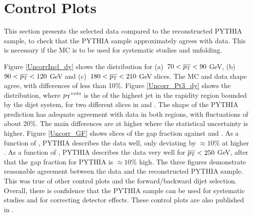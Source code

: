 \section{Control Plots}
\label{sec:GBJ1:Uncorr}
This section presents the selected data compared to the reconstructed PYTHIA sample, to check that the PYTHIA sample approximately agrees with data.
This is necessary if the MC is to be used for systematic studies and unfolding.


Figure \ref{UncorrIncl_dy} shows the \Incl{} distribution for (a)~$70<\mbox{$\overline{p_{\rm T}}$}{}<90$ GeV, (b)~$90<\mbox{$\overline{p_{\rm T}}$}{}<120$ GeV and (c)~$180<\mbox{$\overline{p_{\rm T}}$}{}<210$ GeV slices. 
The MC and data shape agree, with differences of less than 10\%.
Figure \ref{Uncorr_Pt3_dy} shows the \ptDist{} distribution, where $\mbox{$p_{\rm T}$}{}^{veto}$ is the \pt{} of the highest jet in the rapidity region bounded by the dijet system,  for two different slices in \dy{} and \ptb{}. 
The shape of the PYTHIA prediction has adequate agreement with data in both regions, with fluctuations of about 20\%.
The main differences are at higher \pt{} where the statistical uncertainty is higher.
Figure \ref{Uncorr_GF} shows slices of the gap fraction against \dy{} and \ptb{}.
As a function of \dy{}, PYTHIA describes the data well, only deviating by $\approx10\%$ at higher \dy{}.
As a function of \ptb{}, PYTHIA describes the data very well for $\mbox{$\overline{p_{\rm T}}$}{}<250$ GeV, after that the gap fraction for PYTHIA is $\approx10\%$ high.
The three figures demonstrate reasonable agreement between the data and the reconstructed PYTHIA sample. 
This was true of other control plots and the forward/backward dijet selection.
Overall, there is confidence that the PYTHIA sample can be used for systematic studies and for correcting detector effects. 
These control plots are also published in \cite{ref:ATLASGap}.

